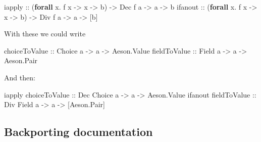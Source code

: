 \documentclass[]{article}
\newenvironment{Shaded}{}{}
\newcommand{\DataTypeTok}[1]{\textcolor[rgb]{0.56,0.13,0.00}{#1}}
\newcommand{\KeywordTok}[1]{\textcolor[rgb]{0.00,0.44,0.13}{\textbf{#1}}}
\newcommand{\NormalTok}[1]{#1}
\newcommand{\OperatorTok}[1]{\textcolor[rgb]{0.40,0.40,0.40}{#1}}
\newcommand{\OtherTok}[1]{\textcolor[rgb]{0.00,0.44,0.13}{#1}}
\begin{document}
\begin{Shaded}
\begin{Highlighting}[]
\OtherTok{iapply  ::}\NormalTok{ (}\KeywordTok{forall}\NormalTok{ x}\OperatorTok{.}\NormalTok{ f x }\OtherTok{{-}\textgreater{}}\NormalTok{ x }\OtherTok{{-}\textgreater{}}\NormalTok{ b) }\OtherTok{{-}\textgreater{}} \DataTypeTok{Dec}\NormalTok{ f a }\OtherTok{{-}\textgreater{}}\NormalTok{ a }\OtherTok{{-}\textgreater{}}\NormalTok{ b}
\OtherTok{ifanout ::}\NormalTok{ (}\KeywordTok{forall}\NormalTok{ x}\OperatorTok{.}\NormalTok{ f x }\OtherTok{{-}\textgreater{}}\NormalTok{ x }\OtherTok{{-}\textgreater{}}\NormalTok{ b) }\OtherTok{{-}\textgreater{}} \DataTypeTok{Div}\NormalTok{ f a }\OtherTok{{-}\textgreater{}}\NormalTok{ a }\OtherTok{{-}\textgreater{}}\NormalTok{ [b]}
\end{Highlighting}
\end{Shaded}

With these we could write

\begin{Shaded}
\begin{Highlighting}[]
\OtherTok{choiceToValue ::} \DataTypeTok{Choice}\NormalTok{ a }\OtherTok{{-}\textgreater{}}\NormalTok{ a }\OtherTok{{-}\textgreater{}} \DataTypeTok{Aeson.Value}
\OtherTok{fieldToValue  ::} \DataTypeTok{Field}\NormalTok{ a  }\OtherTok{{-}\textgreater{}}\NormalTok{ a }\OtherTok{{-}\textgreater{}} \DataTypeTok{Aeson.Pair}
\end{Highlighting}
\end{Shaded}

And then:

\begin{Shaded}
\begin{Highlighting}[]
\NormalTok{iapply}\OtherTok{ choiceToValue ::} \DataTypeTok{Dec} \DataTypeTok{Choice}\NormalTok{ a }\OtherTok{{-}\textgreater{}}\NormalTok{ a }\OtherTok{{-}\textgreater{}} \DataTypeTok{Aeson.Value}
\NormalTok{ifanout}\OtherTok{ fieldToValue ::} \DataTypeTok{Div} \DataTypeTok{Field}\NormalTok{  a }\OtherTok{{-}\textgreater{}}\NormalTok{ a }\OtherTok{{-}\textgreater{}}\NormalTok{ [}\DataTypeTok{Aeson.Pair}\NormalTok{]}
\end{Highlighting}
\end{Shaded}

\subsection{Backporting documentation}\label{backporting-documentation-1}
\end{document}
